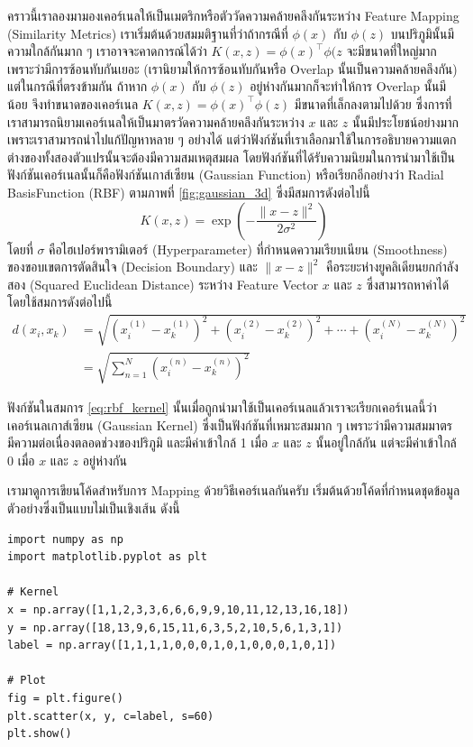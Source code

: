 คราวนี้เราลองมามองเคอร์เนลให้เป็นเมตริกหรือตัววัดความคล้ายคลึงกันระหว่าง Feature Mapping (Similarity Metrics) เราเริ่มต้นด้วยสมมติฐานที่ว่าถ้ากรณีที่ $\phi(x)$ กับ $\phi(z)$ บนปริภูมินั้นมีความใกล้กันมาก ๆ เราอาจจะคาดการณ์ได้ว่า $K(x,z) = \phi(x)^{\top} \phi(z$ จะมีขนาดที่ใหญ่มากเพราะว่ามีการซ้อนทับกันเยอะ (เรานิยามให้การซ้อนทับกันหรือ Overlap นั้นเป็นความคล้ายคลึงกัน) แต่ในกรณีที่ตรงข้ามกัน ถ้าหาก $\phi(x)$ กับ $\phi(z)$ อยู่ห่างกันมากก็จะทำให้การ Overlap นั้นมีน้อย จึงทำขนาดของเคอร์เนล $K(x,z) = \phi(x)^{\top} \phi(z)$ มีขนาดที่เล็กลงตามไปด้วย ซึ่งการที่เราสามารถนิยามเคอร์เนลให้เป็นมาตรวัดความคล้ายคลึงกันระหว่าง $x$ และ
$z$ นั้นมีประโยชน์อย่างมาก เพราะเราสามารถนำไปแก้ปัญหาหลาย ๆ อย่างได้ แต่ว่าฟังก์ชันที่เราเลือกมาใช้ในการอธิบายความแตกต่างของทั้งสองตัวแปรนั้นจะต้องมีความสมเหตุสมผล โดยฟังก์ชันที่ได้รับความนิยมในการนำมาใช้เป็นฟังก์ชันเคอร์เนลนั้นก็คือฟังก์ชันเกาส์เซียน (Gaussian Function) หรือเรียกอีกอย่างว่า Radial BasisFunction (RBF) ตามภาพที่ \ref{fig:gaussian_3d} ซึ่งมีสมการดังต่อไปนี้
%
\begin{equation}\label{eq:rbf_kernel}
    K(x,z) = \exp\left(-\frac{\lVert x - z \rVert^2}{2\sigma^2}\right)
\end{equation}
%
\noindent โดยที่ $\sigma$ คือไฮเปอร์พารามิเตอร์ (Hyperparameter) ที่กำหนดความเรียบเนียน (Smoothness) ของขอบเขตการตัดสินใจ (Decision Boundary) และ $\lVert x - z \rVert^2$ คือระยะห่างยูคลิเดียนยกกำลังสอง (Squared Euclidean Distance) ระหว่าง Feature Vector $x$ และ $z$ ซึ่งสามารถหาค่าได้โดยใช้สมการดังต่อไปนี้
%
\begin{align}
    d(x_{i}, x_{k}) & =
    \sqrt{(x^{(1)}_{i} - x^{(1)}_{k})^{2} + (x^{(2)}_{i} - x^{(2)}_{k})^{2} + \cdots +
    (x^{(N)}_{i} - x^{(N)}_{k})^{2}}                                          \\
                    & = \sqrt{\sum^{N}_{n=1} (x^{(n)}_{i} - x^{(n)}_{k})^{2}}
\end{align}

ฟังก์ชันในสมการ \eqref{eq:rbf_kernel} นั้นเมื่อถูกนำมาใช้เป็นเคอร์เนลแล้วเราจะเรียกเคอร์เนลนี้ว่าเคอร์เนลเกาส์เซียน (Gaussian Kernel) ซึ่งเป็นฟังก์ชันที่เหมาะสมมาก ๆ เพราะว่ามีความสมมาตร มีความต่อเนื่องตลอดช่วงของปริภูมิ และมีค่าเข้าใกล้ 1 เมื่อ $x$ และ $z$ นั้นอยู่ใกล้กัน แต่จะมีค่าเข้าใกล้ 0 เมื่อ $x$ และ $z$ อยู่ห่างกัน

เรามาดูการเขียนโค้ดสำหรับการ Mapping ด้วยวิธีเคอร์เนลกันครับ เริ่มต้นด้วยโค้ดที่กำหนดชุดข้อมูลตัวอย่างซึ่งเป็นแบบไม่เป็นเชิงเส้น ดังนี้

\begin{lstlisting}[style=MyPython]
import numpy as np
import matplotlib.pyplot as plt

# Kernel
x = np.array([1,1,2,3,3,6,6,6,9,9,10,11,12,13,16,18])
y = np.array([18,13,9,6,15,11,6,3,5,2,10,5,6,1,3,1])
label = np.array([1,1,1,1,0,0,0,1,0,1,0,0,0,1,0,1])

# Plot
fig = plt.figure()
plt.scatter(x, y, c=label, s=60)
plt.show()
\end{lstlisting}

